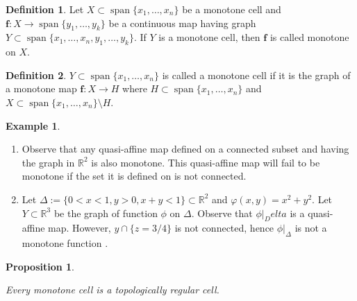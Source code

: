 \documentclass[
]{book}
\newtheorem{proposition}{Proposition}[chapter]
\theoremstyle{definition}
\newtheorem{definition}{Definition}[chapter]
\theoremstyle{definition}
\newtheorem{example}{Example}[chapter]
\theoremstyle{definition}
\theoremstyle{definition}
\theoremstyle{remark}
\begin{document}
\begin{definition}
\protect\hypertarget{def:monotone-map-on}{}\label{def:monotone-map-on}\citep[Definition 2.10]{bgv15}
Let \(X \subset {\operatorname{span} \{x_1,\ldots,x_n\}}\) be a monotone cell and \(\mathbf{f} : X \to {\operatorname{span} \{y_1,\ldots,y_k\}}\) be a continuous map having graph \(Y \subset {\operatorname{span} \{x_1,\ldots,x_n,y_1,\ldots,y_k\}}\). If \(Y\) is a monotone cell, then \(\mathbf{f}\) is called monotone on \(X\).
\end{definition}

\begin{definition}
\protect\hypertarget{def:monotone-cell}{}\label{def:monotone-cell}\citep[Definition 2.5]{bgv15}
\(Y \subset {\operatorname{span} \{x_1,\ldots,x_n\}}\) is called a monotone cell if it is the graph of a monotone map \(\mathbf{f} : X \to H\) where \(H \subset {\operatorname{span} \{x_1,\ldots,x_n\}}\) and \(X \subset {\operatorname{span} \{x_1,\ldots,x_n\}} \setminus H\).
\end{definition}

\begin{example}
\protect\hypertarget{exm:monotone-cells}{}\label{exm:monotone-cells}\leavevmode

\begin{enumerate}
\def\labelenumi{\arabic{enumi}.}
\item
  Observe that any quasi-affine map defined on a connected subset and having the graph in \(\mathbb{R}^2\) is also monotone. This quasi-affine map will fail to be monotone if the set it is defined on is not connected.
\item
  Let \(\Delta := \{ 0 < x < 1, y > 0, x + y < 1 \} \subset \mathbb{R}^2\) and \(\varphi(x,y) = x^2 + y^2\). Let \(Y \subset \mathbb{R}^3\) be the graph of function \(\phi\) on \(\Delta\). Observe that \(\phi\vert_Delta\) is a quasi-affine map. However, \(y \cap \{ z = 3/4 \}\) is not connected, hence \(\phi\vert_\Delta\) is not a monotone function \citep[Example 4.3]{bgv15}.
\end{enumerate}

\end{example}

\begin{proposition}
\protect\hypertarget{prp:monotone-topologically-regular}{}\label{prp:monotone-topologically-regular}\citep[Theorem 1]{bgv13}

Every monotone cell is a topologically regular cell.
\end{proposition}
\end{document}
